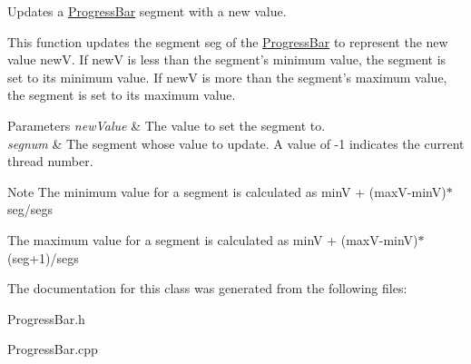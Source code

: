Updates a \hyperlink{classtsgl_1_1_progress_bar}{Progress\-Bar} segment with a new value. 

This function updates the segment {\ttfamily seg} of the \hyperlink{classtsgl_1_1_progress_bar}{Progress\-Bar} to represent the new value {\ttfamily new\-V}. If new\-V is less than the segment's minimum value, the segment is set to its minimum value. If new\-V is more than the segment's maximum value, the segment is set to its maximum value. 
\begin{DoxyParams}{Parameters}
{\em new\-Value} & The value to set the segment to. \\
\hline
{\em segnum} & The segment whose value to update. A value of -\/1 indicates the current thread number. \\
\hline
\end{DoxyParams}
\begin{DoxyNote}{Note}
The minimum value for a segment is calculated as {\ttfamily min\-V + (max\-V-\/min\-V)$\ast$seg/segs} 

The maximum value for a segment is calculated as {\ttfamily min\-V + (max\-V-\/min\-V)$\ast$(seg+1)/segs} 
\end{DoxyNote}


The documentation for this class was generated from the following files\-:\begin{DoxyCompactItemize}
\item 
Progress\-Bar.\-h\item 
Progress\-Bar.\-cpp\end{DoxyCompactItemize}
